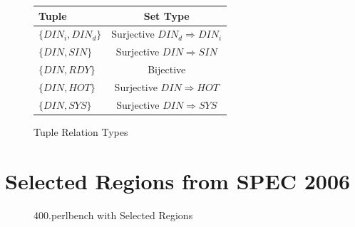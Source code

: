 \documentclass[defaultstyle,11pt]{thesis}
\begin{document}
\begin{figure}
  \begin{centering}
    \begin{minipage}{\hsize}
      \begin{tabular}{ l c }
        Tuple & Set Type \\
        \hline
        $\{DIN_i,DIN_d\}$ & Surjective $DIN_d \Rightarrow DIN_i$  \\
        $\{DIN,SIN\}$ &  Surjective $DIN \Rightarrow SIN$ \\       
        $\{DIN,RDY\}$ &  Bijective \\
        $\{DIN,HOT\}$ &  Surjective $DIN \Rightarrow HOT$ \\
        $\{DIN,SYS\}$ &  Surjective $DIN \Rightarrow SYS$ \\
      \end{tabular}
    \end{minipage}
  \end{centering}
  \caption{Tuple Relation Types}
  \label{fig:tuplerel}
\end{figure}

\chapter{Selected Regions from SPEC 2006} 
\label{appdx:spec2006selreg}

\begin{figure}
  \centering
  \hspace{5mm}
  \caption{400.perlbench with Selected Regions}
  \label{fig:400perlsel}
\end{figure}
\end{document}
